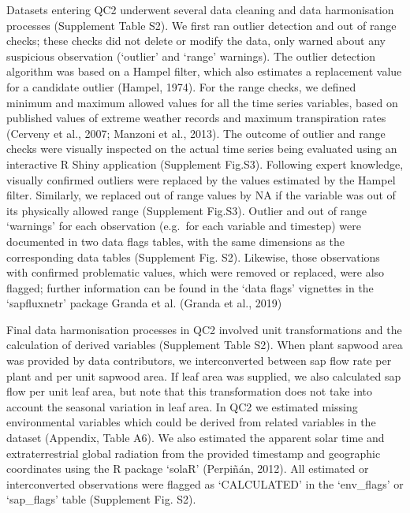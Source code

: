 \documentclass[11pt,twoside]{reedthesis}
\begin{document}
Datasets entering QC2 underwent several data cleaning and data
harmonisation processes (Supplement Table S2). We first ran outlier
detection and out of range checks; these checks did not delete or modify
the data, only warned about any suspicious observation (`outlier' and
`range' warnings). The outlier detection algorithm was based on a Hampel
filter, which also estimates a replacement value for a candidate outlier
(Hampel, 1974). For the range checks, we defined minimum and maximum
allowed values for all the time series variables, based on published
values of extreme weather records and maximum transpiration rates
(Cerveny et al., 2007; Manzoni et al., 2013). The outcome of outlier and
range checks were visually inspected on the actual time series being
evaluated using an interactive R Shiny application (Supplement Fig.S3).
Following expert knowledge, visually confirmed outliers were replaced by
the values estimated by the Hampel filter. Similarly, we replaced out of
range values by NA if the variable was out of its physically allowed
range (Supplement Fig.S3). Outlier and out of range `warnings' for each
observation (e.g.~for each variable and timestep) were documented in two
data flags tables, with the same dimensions as the corresponding data
tables (Supplement Fig. S2). Likewise, those observations with confirmed
problematic values, which were removed or replaced, were also flagged;
further information can be found in the `data flags' vignettes in the
`sapfluxnetr' package Granda et al. (Granda et al., 2019)\par

Final data harmonisation processes in QC2 involved unit transformations
and the calculation of derived variables (Supplement Table S2). When
plant sapwood area was provided by data contributors, we interconverted
between sap flow rate per plant and per unit sapwood area. If leaf area
was supplied, we also calculated sap flow per unit leaf area, but note
that this transformation does not take into account the seasonal
variation in leaf area. In QC2 we estimated missing environmental
variables which could be derived from related variables in the dataset
(Appendix, Table A6). We also estimated the apparent solar time and
extraterrestrial global radiation from the provided timestamp and
geographic coordinates using the R package `solaR' (Perpiñán, 2012). All
estimated or interconverted observations were flagged as `CALCULATED' in
the `env\_flags' or `sap\_flags' table (Supplement Fig. S2).\par
\end{document}
